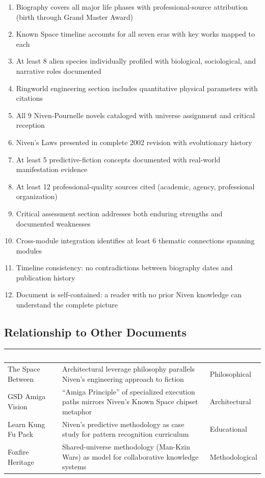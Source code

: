 \documentclass[11pt,letterpaper]{article}
\newcommand{\tableheader}[1]{\textbf{\sffamily\textcolor{white}{#1}}}
\begin{document}
\begin{enumerate}[leftmargin=2em]
\item Biography covers all major life phases with professional-source attribution (birth through Grand Master Award)
\item Known Space timeline accounts for all seven eras with key works mapped to each
\item At least 8 alien species individually profiled with biological, sociological, and narrative roles documented
\item Ringworld engineering section includes quantitative physical parameters with citations
\item All 9 Niven-Pournelle novels cataloged with universe assignment and critical reception
\item Niven's Laws presented in complete 2002 revision with evolutionary history
\item At least 5 predictive-fiction concepts documented with real-world manifestation evidence
\item At least 12 professional-quality sources cited (academic, agency, professional organization)
\item Critical assessment section addresses both enduring strengths and documented weaknesses
\item Cross-module integration identifies at least 6 thematic connections spanning modules
\item Timeline consistency: no contradictions between biography dates and publication history
\item Document is self-contained: a reader with no prior Niven knowledge can understand the complete picture
\end{enumerate}

\subsection{Relationship to Other Documents}

\begin{center}
\begin{tabularx}{\textwidth}{L{4cm}XC{2.5cm}}
\toprule
{}
\tableheader{Document} & \tableheader{Relationship} & \tableheader{Type} \\
\midrule
The Space Between & Architectural leverage philosophy parallels Niven's engineering approach to fiction & Philosophical \\
GSD Amiga Vision & ``Amiga Principle'' of specialized execution paths mirrors Niven's Known Space chipset metaphor & Architectural \\
Learn Kung Fu Pack & Niven's predictive methodology as case study for pattern recognition curriculum & Educational \\
Foxfire Heritage & Shared-universe methodology (Man-Kzin Wars) as model for collaborative knowledge systems & Methodological \\
\bottomrule
\end{tabularx}
\end{center}
\end{document}
